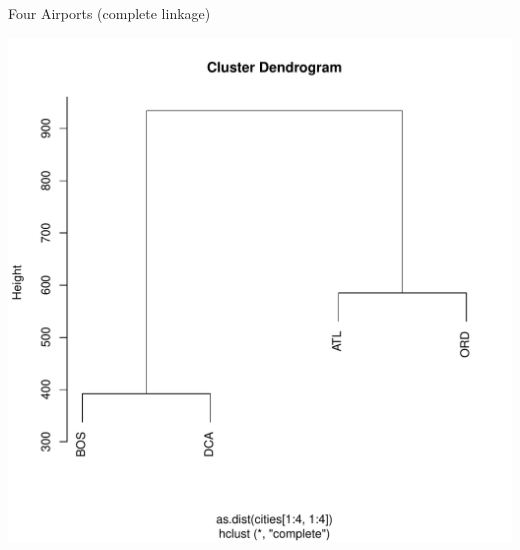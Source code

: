 \documentclass[xcolor=x11names,compress]{beamer}\usepackage[]{graphicx}\usepackage[]{color}
\newenvironment{knitrout}{}{} %
\begin{document}
\begin{frame}[fragile]{Four Airports (complete linkage)}
\begin{knitrout}\tiny
{}\color{fgcolor}

{\centering \includegraphics[width=.6\linewidth]{figure/beamer-apcomp-1} 

}



\end{knitrout}
\end{frame}
\end{document}
